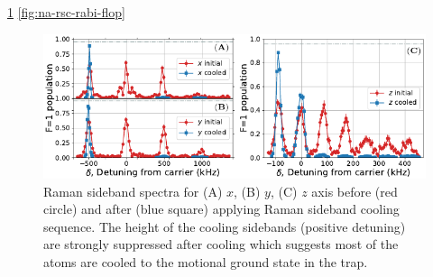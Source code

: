 \ref{fig:na-rsc-spectrum}
\ref{fig:na-rsc-rabi-flop}

\begin{figure}
  \centering
  \includegraphics[width=\textwidth]{figures/na_rsc_spectrum.pdf}
  \caption[Raman sideband spectra before and after cooling]{
    Raman sideband spectra for (A) $x$, (B) $y$, (C) $z$ axis before (red circle)
    and after (blue square) applying Raman sideband cooling sequence.
    The height of the cooling sidebands (positive detuning)
    are strongly suppressed after cooling which suggests most of the atoms are cooled
    to the motional ground state in the trap.
    \label{fig:na-rsc-spectrum}}
\end{figure}

